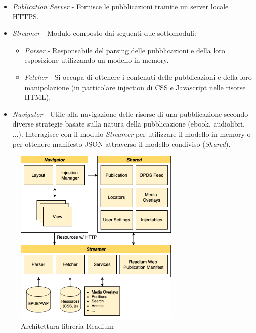 \begin{itemize}
    \item \textit{Publication Server} - Fornisce le pubblicazioni tramite un server locale HTTPS.
    \item \textit{Streamer} - Modulo composto dai seguenti due sottomoduli:
    \begin{itemize}
        \item \textit{Parser} - Responsabile del parsing delle pubblicazioni e della loro esposizione utilizzando un modello in-memory.
        \item \textit{Fetcher} - Si occupa di ottenere i contenuti delle pubblicazioni e della loro manipolazione (in particolare injection di CSS e Javascript nelle risorse HTML).
    \end{itemize}
    \item \textit{Navigator} - Utile alla navigazione delle risorse di una pubblicazione secondo diverse strategie basate sulla natura della pubblicazione (ebook, audiolibri, ...). Interagisce con il modulo \textit{Streamer} per utilizzare il modello in-memory o per ottenere manifesto JSON attraverso il modello condiviso (\textit{Shared}).
\end{itemize}
\begin{figure}[H]
\centering
\includegraphics[width=0.7\textwidth]{img/tesi-22-readiumarch.drawio.png}
\caption{Architettura libreria Readium}
\label{readiumarch}
\end{figure}

